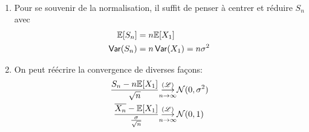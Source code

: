 \begin{remark}\,
    \begin{enumerate}
        \item Pour se souvenir de la normalisation, il suffit de 
        penser à centrer et réduire \(S_n\) avec
        \begin{equation*}
            \begin{aligned}
                \mathbb{E}[S_n] &= n\mathbb{E}[X_1]\\
                \operatorname{\mathsf{Var}}(S_n) &= n\operatorname{\mathsf{Var}}(X_1) = n\sigma^2
            \end{aligned}
        \end{equation*}

        \item On peut réécrire la convergence de diverses façons:
        \begin{equation*}
            \begin{aligned}
                \frac{S_n-n\mathbb{E}[X_1]}{\sqrt{n}} &\underset{n\to\infty}{{\overset{(\mathscr{L})}{\longrightarrow}}} \mathcal N(0,\sigma^2)\\
                \frac{\overline{X_n}-\mathbb{E}[X_1]}{\frac{\sigma}{\sqrt{n}}} &\underset{n\to\infty}{{\overset{(\mathscr{L})}{\longrightarrow}}} \mathcal N(0,1)\\
            \end{aligned}
        \end{equation*}
    \end{enumerate}
\end{remark}